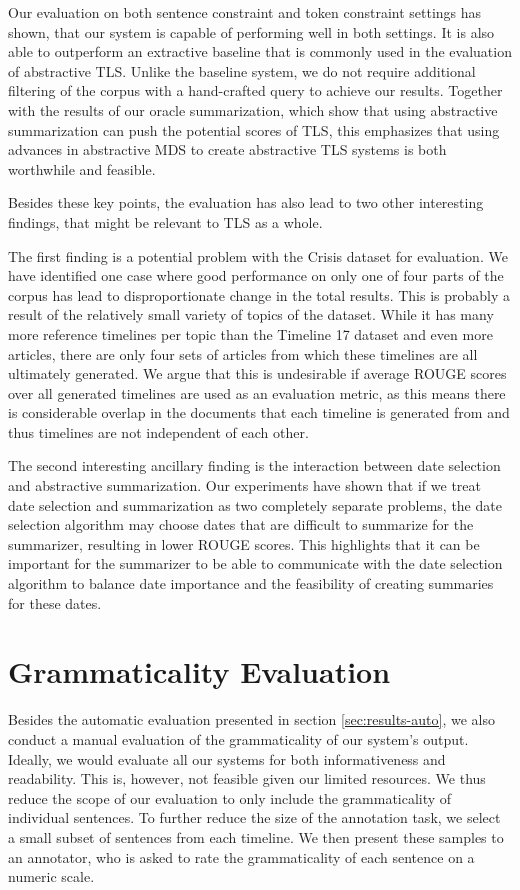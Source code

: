 \documentclass[a4paper,BCOR=10mm]{report}
\numberwithin{lemma}{chapter}
\numberwithin{definition}{chapter}
\begin{document}
Our evaluation on both sentence constraint and token constraint settings has shown, that our system is capable of performing well in both settings. It is also able to outperform an extractive baseline that is commonly used in the evaluation of abstractive TLS.
Unlike the baseline system, we do not require additional filtering of the corpus with a hand-crafted query to achieve our results.
Together with the results of our oracle summarization, which show that using abstractive summarization can push the potential scores of TLS, this emphasizes that using advances in abstractive MDS to create abstractive TLS systems is both worthwhile and feasible.

Besides these key points, the evaluation has also lead to two other interesting findings, that might be relevant to TLS as a whole.

The first finding is a potential problem with the Crisis dataset for evaluation.
We have identified one case where good performance on only one of four parts of the corpus has lead to disproportionate change in the total results.
This is probably a result of the relatively small variety of topics of the dataset. While it has many more reference timelines per topic than the Timeline 17 dataset and even more articles, there are only four sets of articles from which these timelines are all ultimately generated. We argue that this is undesirable if average ROUGE scores over all generated timelines are used as an evaluation metric, as this means there is considerable overlap in the documents that each timeline is generated from and thus timelines are not independent of each other.

The second interesting ancillary finding is the interaction between date selection and abstractive summarization.
Our experiments have shown that if we treat date selection and summarization as two completely separate problems, the date selection algorithm may choose dates that are difficult to summarize for the summarizer, resulting in lower ROUGE scores. This highlights that it can be important for the summarizer to be able to communicate with the date selection algorithm to balance date importance and the feasibility of creating summaries for these dates.

\chapter{Grammaticality Evaluation} \label{sec:results-manual}

Besides the automatic evaluation presented in section \ref{sec:results-auto}, we also conduct a manual evaluation of the grammaticality of our system's output.
Ideally, we would evaluate all our systems for both informativeness and readability. This is, however, not feasible given our limited resources.
We thus reduce the scope of our evaluation to only include the grammaticality of individual sentences.
To further reduce the size of the annotation task, we select a small subset of sentences from each timeline.
We then present these samples to an annotator, who is asked to rate the grammaticality of each sentence on a numeric scale.
\end{document}
